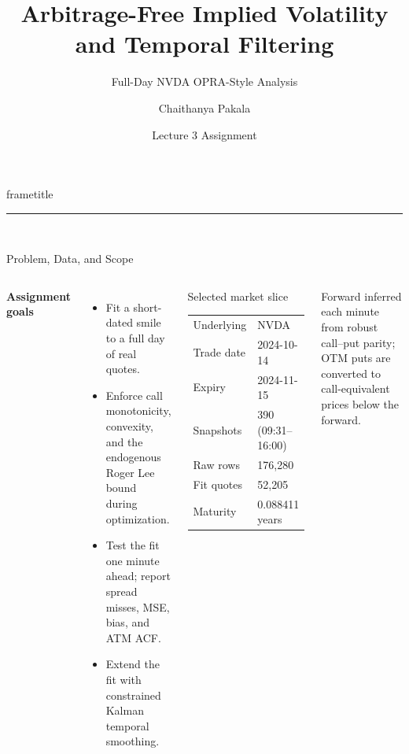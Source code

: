 \documentclass[aspectratio=169,10pt]{beamer}
\title{Arbitrage-Free Implied Volatility\\and Temporal Filtering}
\subtitle{Full-Day NVDA OPRA-Style Analysis}
\author{Chaithanya Pakala}
\institute{MTH 9871 \;\textbullet\; Instructor: Beat Ammon}
\date{Lecture 3 Assignment}
\begin{document}
\begin{frame}[plain]
  \begin{beamercolorbox}[wd=\paperwidth,ht=\paperheight,dp=0ex]{frametitle}
    \vspace{1.15cm}\hspace{1.05cm}
    \begin{minipage}{0.82\paperwidth}
      {\color{teal}\rule{2.0cm}{2.5pt}}\\[0.65cm]
      {\color{white}\fontsize{25}{29}\selectfont\bfseries\inserttitle\par}
      \vspace{0.4cm}
      {\color{white!82}\large\insertsubtitle\par}
      \vfill
      {\color{white}\normalsize\insertauthor\par}
      {\color{white!72}\small\insertinstitute\par}
      \vspace{1.0cm}
    \end{minipage}
  \end{beamercolorbox}
\end{frame}

\begin{frame}{Problem, Data, and Scope}
\begin{columns}[T,onlytextwidth]
\textbf{Assignment goals}
\begin{itemize}
  \item Fit a short-dated smile to a \alert{full day of real quotes}.
  \item Enforce call monotonicity, convexity, and the endogenous Roger Lee bound during optimization.
  \item Test the fit one minute ahead; report spread misses, MSE, bias, and ATM ACF.
  \item Extend the fit with constrained Kalman temporal smoothing.
\end{itemize}
\begin{block}{Selected market slice}
\begin{tabular}{@{}ll@{}}
Underlying & NVDA\\
Trade date & 2024-10-14\\
Expiry & 2024-11-15\\
Snapshots & 390 (09:31--16:00)\\
Raw rows & 176,280\\
Fit quotes & 52,205\\
Maturity & 0.088411 years
\end{tabular}
\end{block}
\vspace{0.25em}
\small Forward inferred each minute from robust call--put parity; OTM puts are converted to call-equivalent prices below the forward.
\end{columns}
\end{frame}
\end{document}
